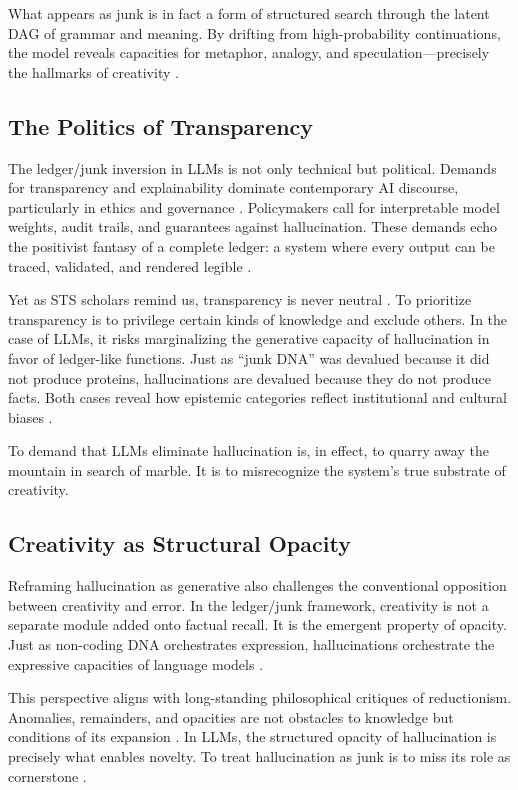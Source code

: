 \documentclass[12pt]{article}
\begin{document}
{{{What appears as junk is in fact a form of structured search through the latent DAG of grammar and meaning. By drifting from high-probability continuations, the model reveals capacities for metaphor, analogy, and speculation---precisely the hallmarks of creativity \citep{bowker2005}.

\subsection{The Politics of Transparency}
The ledger/junk inversion in LLMs is not only technical but political. Demands for transparency and explainability dominate contemporary AI discourse, particularly in ethics and governance \citep{burrell2016}. Policymakers call for interpretable model weights, audit trails, and guarantees against hallucination. These demands echo the positivist fantasy of a complete ledger: a system where every output can be traced, validated, and rendered legible \citep{scott1998}.

Yet as STS scholars remind us, transparency is never neutral \citep{jasanoff2004, haraway1988}. To prioritize transparency is to privilege certain kinds of knowledge and exclude others. In the case of LLMs, it risks marginalizing the generative capacity of hallucination in favor of ledger-like functions. Just as ``junk DNA'' was devalued because it did not produce proteins, hallucinations are devalued because they do not produce facts. Both cases reveal how epistemic categories reflect institutional and cultural biases \citep{glissant1997, anzadua1987}.

To demand that LLMs eliminate hallucination is, in effect, to quarry away the mountain in search of marble. It is to misrecognize the system’s true substrate of creativity.

\subsection{Creativity as Structural Opacity}
Reframing hallucination as generative also challenges the conventional opposition between creativity and error. In the ledger/junk framework, creativity is not a separate module added onto factual recall. It is the emergent property of opacity. Just as non-coding DNA orchestrates expression, hallucinations orchestrate the expressive capacities of language models \citep{rheinberger1997}.

This perspective aligns with long-standing philosophical critiques of reductionism. Anomalies, remainders, and opacities are not obstacles to knowledge but conditions of its expansion \citep{kuhn1962, feyerabend1975}. In LLMs, the structured opacity of hallucination is precisely what enables novelty. To treat hallucination as junk is to miss its role as cornerstone \citep{star1990}.

}}}
\end{document}
